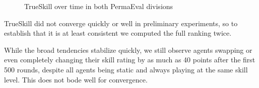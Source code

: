 \begin{figure}[H]
\centering
{}
\caption{TrueSkill over time in both PermaEval divisions}
\label{TrueSkillCompare}
\end{figure}

TrueSkill did not converge quickly or well in preliminary experiments, so to establish that it is at least consistent we computed the full ranking twice.

While the broad tendencies stabilize quickly, we still observe agents swapping or even completely changing their skill rating by as much as 40 points after the first 500 rounds, despite all agents being static and always playing at the same skill level. This does not bode well for convergence.

